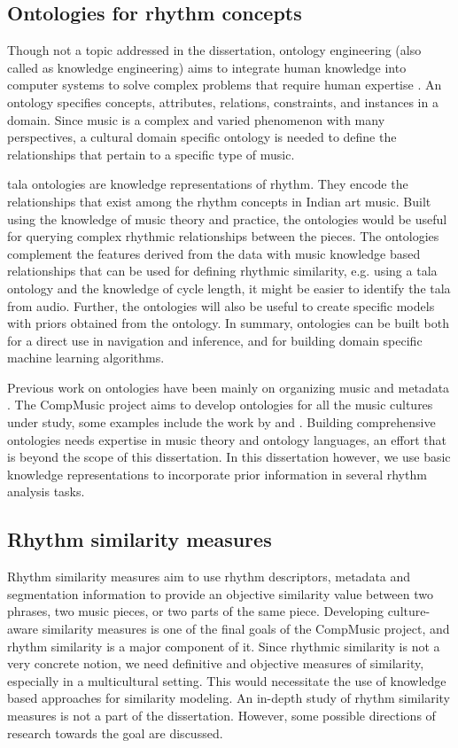 \subsection{Ontologies for rhythm concepts}
Though not a topic addressed in the dissertation, ontology engineering (also called as knowledge engineering) aims to integrate human knowledge into computer systems to solve complex problems that require human expertise \cite{brachman:04:ontology,gomezperez:04:ontology,berners:01:semantic}. An ontology speciﬁes concepts, attributes, relations, constraints, and instances in a domain. Since music is a complex and varied phenomenon with many perspectives, a cultural domain specific ontology is needed to define the relationships that pertain to a specific type of music. 

\Gls{tala} ontologies are knowledge representations of rhythm. They encode the relationships that exist among the rhythm concepts in Indian art music. Built using the knowledge of music theory and practice, the ontologies would be useful for querying complex rhythmic relationships between the pieces. The ontologies complement the features derived from the data with music knowledge based relationships that can be used for defining rhythmic similarity, e.g. using a \gls{tala} ontology and the knowledge of cycle length, it might be easier to identify the \gls{tala} from audio. Further, the ontologies will also be useful to create specific models with priors obtained from the ontology. In summary, ontologies can be built both for a direct use in navigation and inference, and for building domain specific machine learning algorithms. 

Previous work on ontologies have been mainly on organizing music and metadata \cite{swartz:02:musicbrainz,raimond:08:phd}. The CompMusic project aims to develop ontologies for all the music cultures under study, some examples include the work by  and . Building comprehensive ontologies needs expertise in music theory and ontology languages, an effort that is beyond the scope of this dissertation. In this dissertation however, we use basic knowledge representations to incorporate prior information in several rhythm analysis tasks. 
% 
\subsection{Rhythm similarity measures}
Rhythm similarity measures aim to use rhythm descriptors, metadata and segmentation information to provide an objective similarity value between two phrases, two music pieces, or two parts of the same piece. Developing culture-aware similarity measures is one of the final goals of the CompMusic project, and rhythm similarity is a major component of it. Since rhythmic similarity is not a very concrete notion, we need definitive and objective measures of similarity, especially in a multicultural setting. This would necessitate the use of knowledge based approaches for similarity modeling. An in-depth study of rhythm similarity measures is not a part of the dissertation. However, some possible directions of research towards the goal are discussed. 

